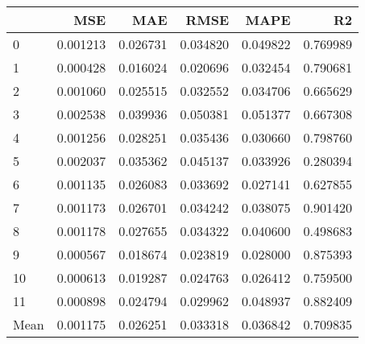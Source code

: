 \begin{tabular}{lrrrrr}
\toprule
 & MSE & MAE & RMSE & MAPE & R2 \\
\midrule
0 & 0.001213 & 0.026731 & 0.034820 & 0.049822 & 0.769989 \\
1 & 0.000428 & 0.016024 & 0.020696 & 0.032454 & 0.790681 \\
2 & 0.001060 & 0.025515 & 0.032552 & 0.034706 & 0.665629 \\
3 & 0.002538 & 0.039936 & 0.050381 & 0.051377 & 0.667308 \\
4 & 0.001256 & 0.028251 & 0.035436 & 0.030660 & 0.798760 \\
5 & 0.002037 & 0.035362 & 0.045137 & 0.033926 & 0.280394 \\
6 & 0.001135 & 0.026083 & 0.033692 & 0.027141 & 0.627855 \\
7 & 0.001173 & 0.026701 & 0.034242 & 0.038075 & 0.901420 \\
8 & 0.001178 & 0.027655 & 0.034322 & 0.040600 & 0.498683 \\
9 & 0.000567 & 0.018674 & 0.023819 & 0.028000 & 0.875393 \\
10 & 0.000613 & 0.019287 & 0.024763 & 0.026412 & 0.759500 \\
11 & 0.000898 & 0.024794 & 0.029962 & 0.048937 & 0.882409 \\
Mean & 0.001175 & 0.026251 & 0.033318 & 0.036842 & 0.709835 \\
\bottomrule
\end{tabular}
